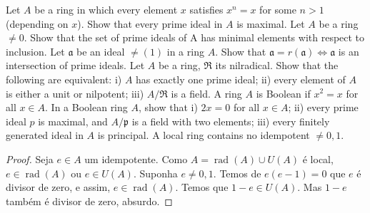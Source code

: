 \documentclass{article}
\newcommand{\rad}{\operatorname{rad}}
\begin{document}
	
	\exercicio Let $A$ be a ring in which every element $x$ satisfies $x^{n}=x$ for some $n>1$ (depending on $x$). Show that every prime ideal in $A$ is maximal.
	\exercicio Let $A$ be a ring $\neq0$. Show that the set of prime ideals of A has minimal elements with respect to inclusion. 
	\exercicio Let $\mathfrak{a}$ be an ideal $\neq(1)$ in a ring $A$. Show that $\mathfrak{a} = r(\mathfrak{a})\iff \mathfrak{a}$ is an intersection of prime ideals.
	\exercicio Let $A$ be a ring, $\Re$ its nilradical. Show that the following are equivalent:
	i) $A$ has exactly one prime ideal;
	ii) every element of $A$ is either a unit or nilpotent;
	iii) $A / \Re$ is a field.
	\exercicio A ring $A$ is Boolean if $x^{2}=x$ for all $x \in A$. In a Boolean ring $A$, show that
	i) $2 x=0$ for all $x \in A$;
	ii) every prime ideal $p$ is maximal, and $A / \mathfrak{p}$ is a field with two elements;
	iii) every finitely generated ideal in $A$ is principal.
	\exercicio A local ring contains no idempotent $\neq 0,1$.
	
	\begin{proof}
		Seja $e\in A$ um idempotente. Como $A =  \rad(A)\cup U(A)$ é local, $e\in\rad(A)$ ou $e\in U(A)$. Suponha $e\neq0,1$. Temos de $e(e-1) = 0$ que $e$ é divisor de zero, e assim, $e\in\rad(A)$. Temos que $1-e\in U(A)$. %
		Mas $1-e$ também é divisor de zero, absurdo.
	\end{proof}
	
\end{document}
